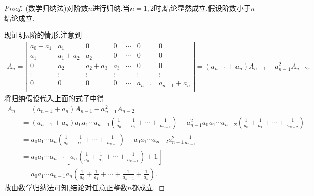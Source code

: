 \documentclass[../../main.tex]{subfiles}%
\begin{document}
    \begin{proof}

    (数学归纳法)对阶数$n$进行归纳.当$n=1,2$时,结论显然成立.假设阶数小于$n$结论成立.
    
    现证明$n$阶的情形.注意到
    \begin{align*}
    A_n=\left| \begin{matrix}
    a_0+a_1&		a_1&		0&		0&		\cdots&		0	&0\\
    a_1&		a_1+a_2&		a_2&		0&		\cdots&		0&		0\\
    0&		a_2&		a_2+a_3&		a_3&		\cdots&		0&		0\\
    \vdots&		\vdots&		\vdots&		\vdots&		&		\vdots&		\vdots\\
    0&		0&		0&		0&		\cdots&		a_{n-1}&		a_{n-1}+a_n\\
    \end{matrix} \right|=\left( a_{n-1}+a_n \right) A_{n-1}-a_{n-1}^{2}A_{n-2}.
    \nonumber
    \end{align*}
    将归纳假设代入上面的式子中得
    \begin{align*}
    A_n&=\left( a_{n-1}+a_n \right) A_{n-1}-a_{n-1}^{2}A_{n-2}
    \\
    &=\left( a_{n-1}+a_n \right) a_0a_1\cdots a_{n-1}\left( \frac{1}{a_0}+\frac{1}{a_1}+\cdots +\frac{1}{a_{n-1}} \right) -a_{n-1}^{2}a_0a_1\cdots a_{n-2}\left( \frac{1}{a_0}+\frac{1}{a_1}+\cdots +\frac{1}{a_{n-2}} \right) 
    \\
    &=a_0a_1\cdots a_n\left( \frac{1}{a_0}+\frac{1}{a_1}+\cdots +\frac{1}{a_{n-1}} \right) +a_0a_1\cdots a_{n-2}a_{n-1}^{2}\frac{1}{a_{n-1}}
    \\
    &=a_0a_1\cdots a_{n-1}\left[ a_n\left( \frac{1}{a_0}+\frac{1}{a_1}+\cdots +\frac{1}{a_{n-1}} \right) +1 \right] 
    \\
    &=a_0a_1\cdots a_{n-1}a_n\left( \frac{1}{a_0}+\frac{1}{a_1}+\cdots +\frac{1}{a_{n-1}}+\frac{1}{a_n} \right) .
    \nonumber
    \end{align*}
    故由数学归纳法可知,结论对任意正整数$n$都成立.
    
\end{proof}
\end{document}
